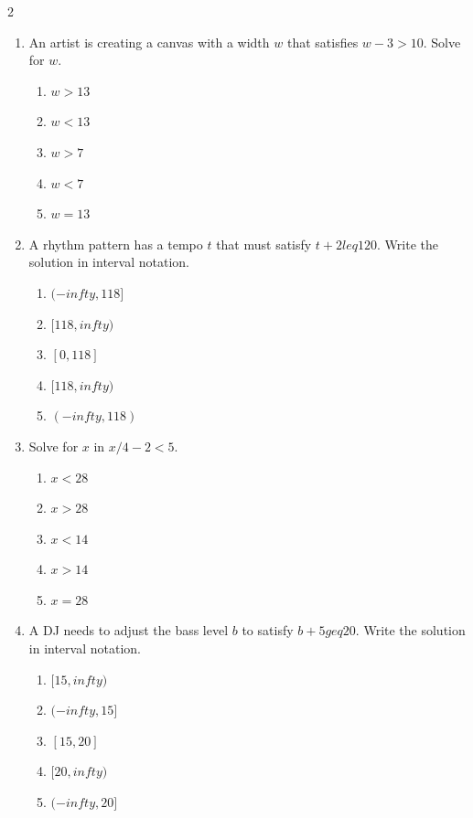 \documentclass[10pt]{article}
\begin{document}
\begin{multicols}{2}
\begin{enumerate}[label=\textbf{Q\arabic*.}, leftmargin=*, itemsep=6pt, parsep=0pt]
  \item \small An artist is creating a canvas with a width $w$ that satisfies $w - 3 > 10$. Solve for $w$.
  \begin{enumerate}[label=(\Alph*), leftmargin=0.6cm, nosep, itemsep=2pt]
    \item $w > 13$
    \item $w < 13$
    \item $w > 7$
    \item $w < 7$
    \item $w = 13$
  \end{enumerate}

  \item \small A rhythm pattern has a tempo $t$ that must satisfy $t + 2 leq 120$. Write the solution in interval notation.
  \begin{enumerate}[label=(\Alph*), leftmargin=0.6cm, nosep, itemsep=2pt]
    \item $(-infty, 118]$
    \item $[118, infty)$
    \item $[0, 118]$
    \item $[118, infty)$
    \item $(-infty, 118)$
  \end{enumerate}

  \item \small Solve for $x$ in $x/4 - 2 < 5$.
  \begin{enumerate}[label=(\Alph*), leftmargin=0.6cm, nosep, itemsep=2pt]
    \item $x < 28$
    \item $x > 28$
    \item $x < 14$
    \item $x > 14$
    \item $x = 28$
  \end{enumerate}

  \item \small A DJ needs to adjust the bass level $b$ to satisfy $b + 5 geq 20$. Write the solution in interval notation.
  \begin{enumerate}[label=(\Alph*), leftmargin=0.6cm, nosep, itemsep=2pt]
    \item $[15, infty)$
    \item $(-infty, 15]$
    \item $[15, 20]$
    \item $[20, infty)$
    \item $(-infty, 20]$
  \end{enumerate}


\end{enumerate}
\end{multicols}
\end{document}
